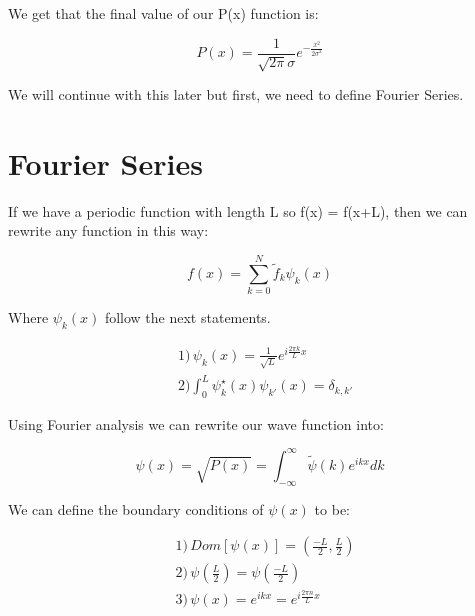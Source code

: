 We get that the final value of our P(x) function is:

\begin{equation}
\label{P(x)_final_def}
    P(x) = \frac{1}{\sqrt{2\pi}\sigma} e^{-\frac{x^2}{2 \sigma^2}}
\end{equation}

We will continue with this later but first, we need to define Fourier Series.

\section{Fourier Series}

If we have a periodic function with length L so f(x) = f(x+L), then we can rewrite any function in this way:

\begin{equation}
\label{fourier}
    f(x) = \sum_{k=0}^{N} \tilde{f}_{k}\psi_{k}(x)
\end{equation}

Where $\psi_k(x)$ follow the next statements.

\begin{equation}\label{psi_k_fourier}
    \begin{split}
        &1)\hspace{2pt} \psi_k(x) = \frac{1}{\sqrt{L}}e^{i\frac{2\pi k}{L}x} \\
        &2) \int_0^L \psi_{k}^{\star}(x)\psi_{k'}(x) = \delta_{k,k'}
    \end{split}
\end{equation}


Using Fourier analysis we can rewrite our wave function into:

\begin{equation}
    \label{fourir_psi}
    \psi(x) = \sqrt{P(x)} = \int_{-\infty}^{\infty} \tilde{\psi}(k)e^{ikx}dk
\end{equation}

We can define the boundary conditions of $\psi(x)$ to be:

\begin{equation}
    \label{rules_psi_fourier}
    \begin{split}
        &1) \hspace{2pt} Dom[\psi(x)]= \left( \frac{-L}{2},\frac{L}{2} \right) \\
        &2) \hspace{2pt} \psi(\frac{L}{2})=\psi(\frac{-L}{2})\\
        &3) \hspace{2pt} \psi(x) = e^{ikx}=e^{i\frac{2\pi n}{L}x}
    \end{split}
\end{equation}

